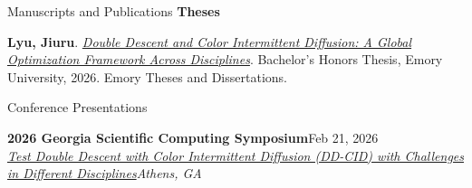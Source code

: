 \documentclass[10pt, letterpaper]{resume} %
\begin{document}
\begin{rSection}{Manuscripts and Publications}
{\bf\large Theses}
\begin{etaremune}
\renewcommand{\labelenumi}{[T\arabic{enumi}]}
\setlength{\itemsep}{-0.5em}
	\item \textbf{Lyu, Jiuru}. \href{https://etd.library.emory.edu/concern/etds/1g05fd258?locale=en}{\textit{Double Descent and Color Intermittent Diffusion: A Global Optimization Framework Across Disciplines}}. Bachelor's Honors Thesis, Emory University, 2026. Emory Theses and Dissertations.
\end{etaremune}
\end{rSection}

\begin{rSection}{Conference Presentations}  
\begin{etaremune}
\renewcommand{\labelenumi}{[C\arabic{enumi}]}
\setlength{\itemsep}{-0.5em}
	\item \textbf{2026 Georgia Scientific Computing Symposium}\hfill{Feb 21, 2026}\\\href{https://haoningwu.github.io/GSCS2026.html}{\textit{Test Double Descent with Color Intermittent Diffusion (DD-CID) with Challenges in Different Disciplines}}\hfill\textit{Athens, GA}
\end{etaremune}
\end{rSection}
\end{document}
